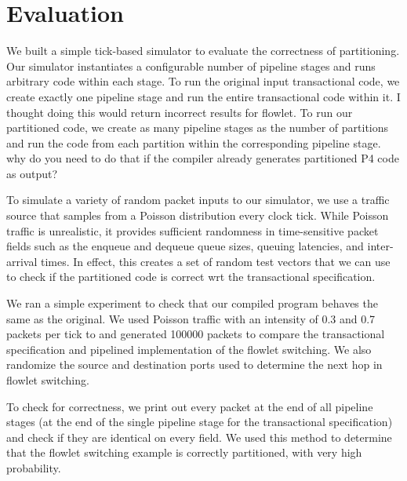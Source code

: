 \section{Evaluation}
\label{s:evaluation}

We built a simple tick-based simulator to evaluate the correctness of
partitioning. Our simulator instantiates a configurable number of pipeline
stages and runs arbitrary code within each stage. To run the
original input transactional code, we create exactly one pipeline stage and run
the entire transactional code within it. \ac{I thought doing this would return 
incorrect results for flowlet.} To run our partitioned code, we create
as many pipeline stages as the number of partitions and run the code from each
partition within the corresponding pipeline stage. \ac{why do you need to do 
that if the compiler already generates partitioned P4 code as output?}

To simulate a variety of random packet inputs to our simulator, we use a
traffic source that samples from a Poisson distribution every clock tick.
While Poisson traffic is unrealistic, it provides sufficient randomness in
time-sensitive packet fields such as the enqueue and dequeue queue sizes,
queuing latencies, and inter-arrival times. In effect, this creates a set of
random test vectors that we can use to check if the partitioned code is correct
wrt the transactional specification.

We ran a simple experiment to check that our compiled \pktlanguage program
behaves the same as the original. 
We used Poisson traffic with an intensity of 0.3 and 0.7 packets per tick to
and generated 100000 packets to compare the transactional specification and
pipelined implementation of the flowlet switching. We also randomize the source
and destination ports used to determine the next hop in flowlet switching.

To check for correctness, we print out every packet at the end of all pipeline
stages (at the end of the single pipeline stage for the transactional
specification) and check if they are identical on every field. We used this
method to determine that the flowlet switching example is correctly
partitioned, with very high probability.

